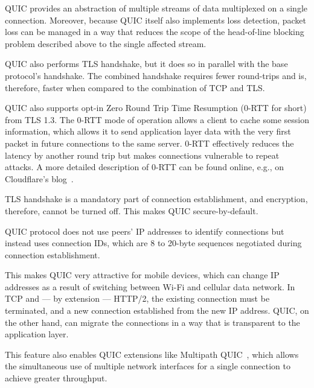\begin{itemize}

     QUIC provides an abstraction of multiple streams of data multiplexed
    on a single connection. Moreover, because QUIC itself also implements loss detection, packet
    loss can be managed in a way that reduces the scope of the head-of-line blocking problem
    described above to the single affected stream.

     QUIC also performs TLS handshake, but it does so in
    parallel with the base protocol's handshake. The combined handshake requires fewer round-trips
    and is, therefore, faster when compared to the combination of TCP and TLS\@.

    QUIC also supports opt-in Zero Round Trip Time Resumption (0-RTT for short) from TLS 1.3. The
    0-RTT mode of operation allows a client to cache some session information, which allows it to
    send application layer data with the very first packet in future connections to the same server.
    0-RTT effectively reduces the latency by another round trip but makes connections vulnerable to
    repeat attacks. A more detailed description of 0-RTT can be found online, e.g., on Cloudflare's
    blog~\cite{cloudflare-0rtt}.

     TLS handshake is a mandatory part of connection establishment, and
    encryption, therefore, cannot be turned off. This makes QUIC secure-by-default.

     QUIC protocol does not use peers'
    IP addresses to identify connections but instead uses connection IDs, which are 8 to 20-byte
    sequences negotiated during connection establishment.

    This makes QUIC very attractive for mobile devices, which can change IP addresses as a result of
    switching between Wi-Fi and cellular data network. In TCP and --- by extension --- HTTP/2, the
    existing connection must be terminated, and a new connection established from the new IP
    address. QUIC, on the other hand, can migrate the connections in a way that is transparent to
    the application layer.

    This feature also enables QUIC extensions like Multipath
    QUIC~\cite{draft-deconinck-quic-multipath-04}, which allows the simultaneous use of multiple
    network interfaces for a single connection to achieve greater throughput.

\end{itemize}

